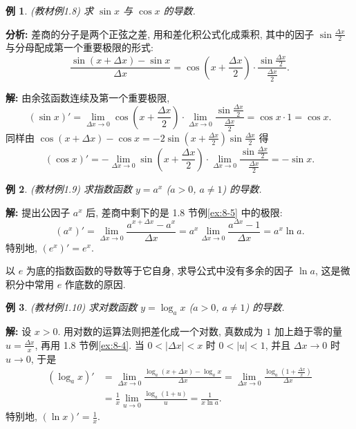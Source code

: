 \documentclass[UTF8,openany]{ctexbook}
\theoremstyle{chinesetextbook}
\newtheorem{example}{例}[section]
\newenvironment{cnsolution}{\par\indent\textbf{解:} \ignorespaces}{\par}
\begin{document}
\begin{example}\label{ex:c2-1-8}
\textnormal{(教材例1.8)} 求 $\sin x$ 与 $\cos x$ 的导数.
\end{example}
\par\indent\textbf{分析:} 差商的分子是两个正弦之差, 用和差化积公式化成乘积, 其中的因子 $\displaystyle\sin\frac{\Delta x}2$ 与分母配成第一个重要极限的形式:
\[
\frac{\sin(x+\Delta x)-\sin x}{\Delta x}=\cos\left(x+\frac{\Delta x}2\right)\cdot\frac{\sin\frac{\Delta x}2}{\frac{\Delta x}2}.
\]
\begin{cnsolution}
由余弦函数连续及第一个重要极限,
\[
(\sin x)'=\lim_{\Delta x\to0}\cos\left(x+\frac{\Delta x}2\right)\cdot\lim_{\Delta x\to0}\frac{\sin\frac{\Delta x}2}{\frac{\Delta x}2}=\cos x\cdot1=\cos x.
\]
同样由 $\displaystyle\cos(x+\Delta x)-\cos x=-2\sin\left(x+\frac{\Delta x}2\right)\sin\frac{\Delta x}2$ 得
\[
(\cos x)'=-\lim_{\Delta x\to0}\sin\left(x+\frac{\Delta x}2\right)\cdot\lim_{\Delta x\to0}\frac{\sin\frac{\Delta x}2}{\frac{\Delta x}2}=-\sin x.
\]
\end{cnsolution}
\begin{example}\label{ex:c2-1-9}
\textnormal{(教材例1.9)} 求指数函数 $y=a^x$ ($a>0$, $a\ne1$) 的导数.
\end{example}
\begin{cnsolution}
提出公因子 $a^x$ 后, 差商中剩下的是 1.8 节例\ref{ex:8-5} 中的极限:
\[
(a^x)'=\lim_{\Delta x\to0}\frac{a^{x+\Delta x}-a^x}{\Delta x}=a^x\lim_{\Delta x\to0}\frac{a^{\Delta x}-1}{\Delta x}=a^x\ln a.
\]
特别地, $(e^x)'=e^x$.
\end{cnsolution}
以 $e$ 为底的指数函数的导数等于它自身, 求导公式中没有多余的因子 $\ln a$, 这是微积分中常用 $e$ 作底数的原因.
\begin{example}\label{ex:c2-1-10}
\textnormal{(教材例1.10)} 求对数函数 $y=\log_ax$ ($a>0$, $a\ne1$) 的导数.
\end{example}
\begin{cnsolution}
设 $x>0$. 用对数的运算法则把差化成一个对数, 真数成为 $1$ 加上趋于零的量 $\displaystyle u=\frac{\Delta x}x$, 再用 1.8 节例\ref{ex:8-4}. 当 $0<|\Delta x|<x$ 时 $0<|u|<1$, 并且 $\Delta x\to0$ 时 $u\to0$, 于是
\[
\begin{aligned}
(\log_ax)'&=\lim_{\Delta x\to0}\frac{\log_a(x+\Delta x)-\log_ax}{\Delta x}=\lim_{\Delta x\to0}\frac{\log_a\left(1+\frac{\Delta x}x\right)}{\Delta x}\\
&=\frac1x\lim_{u\to0}\frac{\log_a(1+u)}u=\frac1{x\ln a}.
\end{aligned}
\]
特别地, $\displaystyle(\ln x)'=\frac1x$.
\end{cnsolution}
\end{document}
